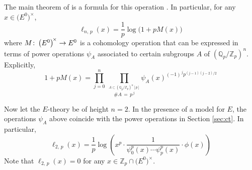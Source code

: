 \documentclass{gtpart}
\theoremstyle{definition}
\theoremstyle{remark}
\def\co{\colon\thinspace}
\newcommand{\mb}[1]{\mathbb{#1}}
\newcommand{\BQ}{{\mb Q}}
\newcommand{\BZ}{{\mb Z}}
\renewcommand{\=}{\approx}
\renewcommand{\-}{\sim}
\numberwithin{equation}{section}
\begin{document}
The main theorem of \cite{log} is a formula for this operation 
\cite[Theorem 1.11]{log}.  In particular, for any 
$x \in \big( E^0 \big)^{\!\times}$, 
\begin{equation}
 \label{M}
 \ell_{n,\,p}(x) = \frac{1}{p} \log\big(1 + p M(x)\big) 
\end{equation}
where $M \co \big( E^0 \big)^{\!\times} \to E^0$ is a cohomology operation that 
can be expressed in terms of power operations $\psi_A$ associated to certain 
subgroups $A$ of $(\BQ_p/\BZ_p)^n$.  Explicitly, 
\[
 1 + p M(x) = \prod_{j=0}^n ~ \prod_{\stackrel{\scriptstyle A \subset 
 (\BQ_p/\BZ_p)^n [p]}{\#A \, = \, p^{\,j}}} 
 \psi_A(x)^{(-1)^{\,j} p^{(j-1)(j-2)/2}} 
\]

Now let the $E$-theory be of height $n = 2$.  In the presence of a model for 
$E$, the operations $\psi_A$ above coincide with the power operations in Section 
\ref{sec:ct}.  In particular, 
\begin{equation}
 \label{l2p}
 \ell_{2,\,p}(x) = \frac{1}{p} \log \left( x^p \cdot 
 \frac{1}{\psi^p_0(x) \cdots \psi^p_p(x)} \cdot \phi(x) \right) 
\end{equation}
Note that $\ell_{2,\,p}(x) = 0$ for any 
$x \in \BZ_p \cap \big( E^0 \big)^{\!\times}$.  
\end{document}
